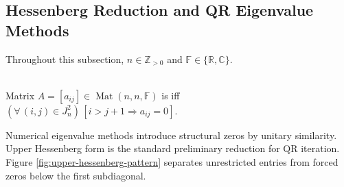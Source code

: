 \subsection{Hessenberg Reduction and QR Eigenvalue Methods}

Throughout this subsection, $n\in\mathbb{Z}_{>0}$ and $\mathbb{F}\in\{\mathbb{R},\mathbb{C}\}$.

\begin{definition} \label{def:upper-hessenberg-matrix} \\
Matrix $A=[a_{ij}]\in\operatorname{Mat}(n,n,\mathbb{F})$ is  iff $(\forall\,(i,j)\in J_n^2)\,[i>j+1\Longrightarrow a_{ij}=0]$.
\end{definition}

Numerical eigenvalue methods introduce structural zeros by unitary similarity.\\
Upper Hessenberg form is the standard preliminary reduction for QR iteration.\\
Figure \ref{fig:upper-hessenberg-pattern} separates unrestricted entries from forced zeros below the first subdiagonal.

\begin{illustrationfigure}[H]
  
  \caption{Upper Hessenberg pattern: asterisks are unrestricted and entries below the first subdiagonal are zero.}
  \label{fig:upper-hessenberg-pattern}
\end{illustrationfigure}

